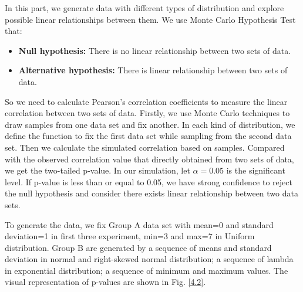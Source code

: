 \documentclass[12pt]{article}
\numberwithin{figure}{section}
\begin{document}
In this part, we generate data with different types of distribution and explore possible linear relationships between them. We use Monte Carlo Hypothesis Test that:
\begin{itemize}
    \item \textbf{Null hypothesis:} There is no linear relationship between two sets of data.
    \item \textbf{Alternative hypothesis:} There is linear relationship between two sets of data.
\end{itemize}
So we need to calculate Pearson's correlation coefficients to measure the linear correlation between two sets of data. Firstly, we use Monte Carlo techniques to draw samples from one data set and fix another. In each kind of distribution, we define the function to fix the first data set while sampling from the second data set. Then we calculate the simulated correlation based on samples. Compared with the observed correlation value that directly obtained from two sets of data, we get the two-tailed p-value. In our simulation, let $\alpha = 0.05$ is the significant level. If p-value is less than or equal to 0.05, we have strong confidence to reject the null hypothesis and consider there exists linear relationship between two data sets.

To generate the data, we fix Group A data set with mean=0 and standard deviation=1 in first three experiment, min=3 and max=7 in Uniform distribution. Group B are generated by a sequence of means and standard deviation in normal and right-skewed normal distribution; a sequence of lambda in exponential distribution; a sequence of minimum and maximum values. The visual representation of p-values are shown in Fig. \ref{4.2}.
\end{document}
